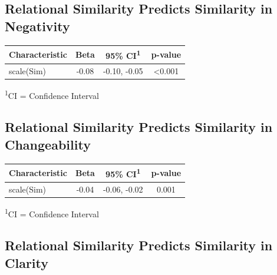 \documentclass[
  .7em,
  letterpaper,
  DIV=11,
  numbers=noendperiod]{scrartcl}
\begin{document}
\hypertarget{relational-similarity-predicts-similarity-in-negativity}{%
\subsection{Relational Similarity Predicts Similarity in
Negativity}\label{relational-similarity-predicts-similarity-in-negativity}}

\captionsetup[table]{labelformat=empty,skip=1pt}
\setlength{\LTpost}{0mm}
\begin{longtable}{lccc}
\toprule
\textbf{Characteristic} & \textbf{Beta} & \textbf{95\% CI}\textsuperscript{1} & \textbf{p-value} \\ 
\midrule
scale(Sim) & -0.08 & -0.10, -0.05 & <0.001 \\ 
\bottomrule
\end{longtable}
\begin{minipage}{\linewidth}
\textsuperscript{1}CI = Confidence Interval\\
\end{minipage}

\hypertarget{relational-similarity-predicts-similarity-in-changeability}{%
\subsection{Relational Similarity Predicts Similarity in
Changeability}\label{relational-similarity-predicts-similarity-in-changeability}}

\captionsetup[table]{labelformat=empty,skip=1pt}
\setlength{\LTpost}{0mm}
\begin{longtable}{lccc}
\toprule
\textbf{Characteristic} & \textbf{Beta} & \textbf{95\% CI}\textsuperscript{1} & \textbf{p-value} \\ 
\midrule
scale(Sim) & -0.04 & -0.06, -0.02 & 0.001 \\ 
\bottomrule
\end{longtable}
\begin{minipage}{\linewidth}
\textsuperscript{1}CI = Confidence Interval\\
\end{minipage}

\hypertarget{relational-similarity-predicts-similarity-in-clarity}{%
\subsection{Relational Similarity Predicts Similarity in
Clarity}\label{relational-similarity-predicts-similarity-in-clarity}}
\end{document}

